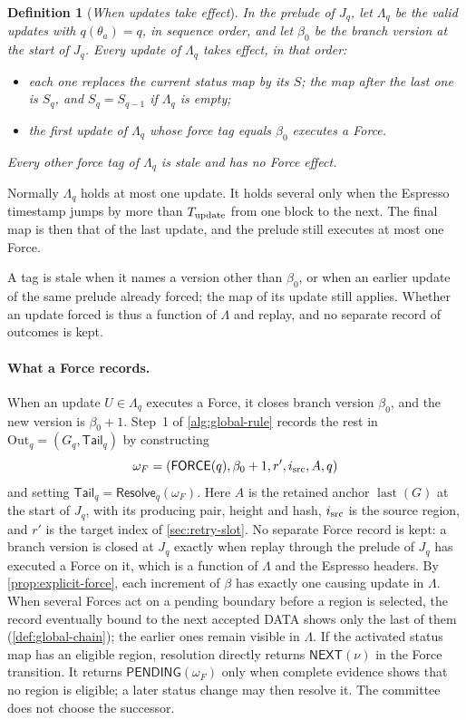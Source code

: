 \documentclass[11pt,a4paper]{article}
\newcommand{\tagg}[1]{\ensuremath{\mathsf{#1}}}
\newcommand{\defterm}[1]{\textcolor{rrBlue}{\textit{#1}}}
\newtheorem{definition}{Definition}[section]
\begin{document}
\begin{definition}[\defterm{When updates take effect}]
\label{def:control-effect}
In the prelude of $J_q$, let $\Lambda_q$ be the valid updates with
$q(\theta_a)=q$, in sequence order, and let $\beta_0$ be the branch
version at the start of $J_q$. Every update of $\Lambda_q$ takes effect,
in that order:
\begin{itemize}
\item each one replaces the current status map by its $S$; the map after
the last one is $S_q$, and $S_q=S_{q-1}$ if $\Lambda_q$ is empty;
\item the first update of $\Lambda_q$ whose force tag equals $\beta_0$
executes a Force.
\end{itemize}
Every other force tag of $\Lambda_q$ is \defterm{stale} and has no
Force effect.
\end{definition}
Normally $\Lambda_q$ holds at most one update. It holds several only when the
Espresso timestamp jumps by more than $T_{\rm update}$ from one block to
the next. The final map is then that of the last update, and the prelude
still executes at most one Force.

A tag is stale when it names a version other than $\beta_0$, or when an
earlier update of the same prelude already forced; the map of its update
still applies. Whether an update forced is thus a function of $\Lambda$
and replay, and no separate record of outcomes is kept.

\paragraph{What a Force records.}
When an update $U\in\Lambda_q$ executes a Force, it closes branch version
$\beta_0$, and the new version is $\beta_0+1$. Step~1 of
\cref{alg:global-rule} records the rest in
$\mathrm{Out}_q=(G_q,\mathsf{Tail}_q)$ by constructing
\[
 \omega_F=(\tagg{FORCE}(q),\beta_0+1,r',i_{\rm src},A,q)
\]
and setting $\mathsf{Tail}_q=\tagg{Resolve}_q(\omega_F)$. Here $A$ is
the retained anchor $\operatorname{last}(G)$ at the start of $J_q$, with
its producing pair, height and hash, $i_{\rm src}$ is the source region,
and $r'$ is the target index of \cref{sec:retry-slot}. No separate Force
record is kept: a branch version is closed at $J_q$ exactly when replay
through the prelude of $J_q$ has executed a Force on it, which is a
function of $\Lambda$ and the Espresso headers. By
\cref{prop:explicit-force}, each increment of $\beta$ has exactly one
causing update in $\Lambda$. When several Forces act on a pending
boundary before a region is selected, the record eventually bound to
the next accepted DATA shows only the last of them
(\cref{def:global-chain}); the earlier ones remain visible in $\Lambda$.
If the activated status map has an eligible region, resolution directly
returns $\tagg{NEXT}(\nu)$ in the Force transition.  It returns
$\tagg{PENDING}(\omega_F)$ only when complete evidence shows that no
region is eligible; a later status change may then resolve it.  The
committee does not choose the successor.
\end{document}
